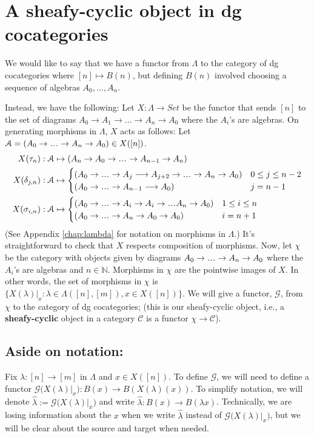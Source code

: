 \section{A sheafy-cyclic object in dg cocategories}\label{sec:cyclic_B(n)}
We would like to say that we have a functor 
from $\Lambda$ to the category of dg 
cocategories where $[n] \mapsto B(n)$, 
but defining $B(n)$ involved choosing a 
sequence of algebras $A_0, \dots, A_n$. 

Instead, we have the following: 
Let $X: \Lambda \to Set$ be the functor 
that sends $[n]$ to the set of diagrams 
$A_0 \to A_1 \to \dots \to A_n \to A_0$ 
where the $A_i$'s are algebras. On 
generating morphisms in $\Lambda$, 
$X$ acts as follows: Let $\mathcal{A} = 
(A_0 \to \smdots \to A_n \to A_0)
\in X([n])$. 
\begin{align*}
X(\tau_n): \mathcal{A}
  &\mapsto (A_n \to A_0 \to \smdots \to A_{n-1} \to A_n)\\
X(\delta_{j,n}): \mathcal{A}
  &\mapsto 
  \begin{cases}
    (A_0 \to \smdots \to A_j\longrightarrow A_{j+2} 
      \to \smdots \to A_n \to A_0) 
    & 0 \leq j \leq n-2\\
    (A_0 \to \smdots \to A_{n-1}\longrightarrow A_0)
    & j = n-1
  \end{cases}\\
X(\sigma_{i,n}): \mathcal{A}
  &\mapsto 
  \begin{cases}
    (A_0 \to \smdots \to 
  		   A_i \to A_i \to \smdots A_n \to A_0)
    & 1 \leq i \leq n\\
    (A_0 \to \smdots \to A_n \to A_0 \to A_0)
    & i=n+1	
  \end{cases}	   
\end{align*}
(See Appendix \ref{chap:lambda} for 
notation on morphisms in $\Lambda$.) It's 
straightforward to 
check that $X$ respects composition of morphisms. 
Now, let $\chi$ be the category with objects given by
diagrams $A_0 \to \smdots \to A_n \to A_0$ 
where the $A_i$'s are algebras and $n \in \mathbb{N}$. 
Morphisms in $\chi$ are the pointwise images of 
$X$. In other words, the set of morphisms in
$\chi$ is $\{ X(\lambda)|_x: \lambda \in 
\Lambda([n],[m]), x \in X([n]) \}$. We will give 
a functor, $\mathcal{G}$, from $\chi$ to the 
category of dg 
cocategories; (this is our sheafy-cyclic object, 
i.e., a \textbf{sheafy-cyclic} object in a 
category $\mathcal{C}$ is a functor $\chi \to 
\mathcal{C}$).
%
\subsection{Aside on notation:} 
Fix $\lambda:[n] \to [m]$ in $\Lambda$ 
and $x \in X([n])$. To define $\mathcal{G}$, 
we will need to define a functor $\mathcal{G}
\big(X(\lambda)|_x \big): B(x) \to B(X(\lambda)(x))$. 
To simplify notation, we will denote 
$\hat{\lambda} := \mathcal{G}
\big(X(\lambda)|_x \big)$ and write 
$\hat{\lambda}: B(x) \to B(\lambda x)$. 
Technically, we are losing information 
about the $x$ when we write 
$\hat{\lambda}$ instead of $\mathcal{G}
\big(X(\lambda)|_x \big)$, but 
we will be clear 
about the source and target when needed.
%
